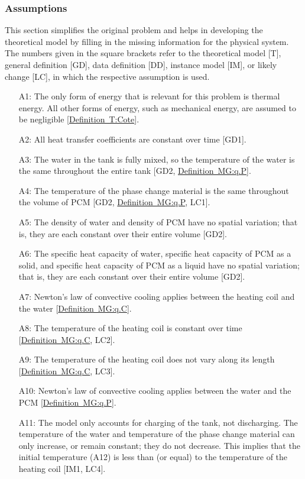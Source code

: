 \documentclass[12pt]{article}
\begin{document}
\subsubsection{Assumptions}
\label{Sec:As}
This section simplifies the original problem and helps in developing the theoretical model by filling in the missing information for the physical system. The numbers given in the square brackets refer to the theoretical model [T], general definition [GD], data definition [DD], instance model [IM], or likely change [LC], in which the respective assumption is used.
\begin{itemize}
\item[A1:]The only form of energy that is relevant for this problem is thermal energy. All other forms of energy, such as mechanical energy, are assumed to be negligible [\hyperref[T:Cote]{Definition~T:Cote}].
\item[A2:]All heat transfer coefficients are constant over time [GD1].
\item[A3:]The water in the tank is fully mixed, so the temperature of the water is the same throughout the entire tank [GD2, \hyperref[MG:q.P]{Definition~MG:q.P}].
\item[A4:]The temperature of the phase change material is the same throughout the volume of PCM [GD2, \hyperref[MG:q.P]{Definition~MG:q.P}, LC1].
\item[A5:]The density of water and density of PCM have no spatial variation; that is, they are each constant over their entire volume [GD2].
\item[A6:]The specific heat capacity of water, specific heat capacity of PCM as a solid, and specific heat capacity of PCM as a liquid have no spatial variation; that is, they are each constant over their entire volume [GD2].
\item[A7:]Newton's law of convective cooling applies between the heating coil and the water [\hyperref[MG:q.C]{Definition~MG:q.C}].
\item[A8:]The temperature of the heating coil is constant over time [\hyperref[MG:q.C]{Definition~MG:q.C}, LC2].
\item[A9:]The temperature of the heating coil does not vary along its length [\hyperref[MG:q.C]{Definition~MG:q.C}, LC3].
\item[A10:]Newton's law of convective cooling applies between the water and the PCM [\hyperref[MG:q.P]{Definition~MG:q.P}].
\item[A11:]The model only accounts for charging of the tank, not discharging. The temperature of the water and temperature of the phase change material can only increase, or remain constant; they do not decrease. This implies that the initial temperature (A12) is less than (or equal) to the temperature of the heating coil [IM1, LC4].

\end{itemize}
\end{document}
